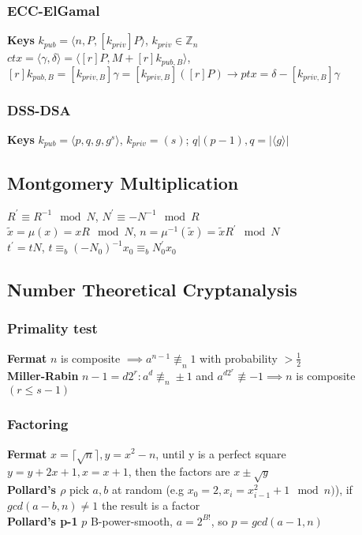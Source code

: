 \documentclass[twoside, 11pt]{article}
\begin{document}
            \subsubsection*{ECC-ElGamal}
                \textbf{Keys} $k_{pub} = \langle n, P, [k_{priv}]P \rangle$, $k_{priv} \in \mathds{Z}_{n}$ \\
                $ctx = \langle \gamma,  \delta \rangle = \langle[r]P, M+[r]k_{pub,B}\rangle$, $[r]k_{pub, B} = [k_{priv, B}]\gamma = [k_{priv, B}]([r]P) \rightarrow ptx = \delta - [k_{priv, B}]\gamma$
                
            \subsubsection*{DSS-DSA}
                \textbf{Keys} $k_{pub} = \langle p, q, g, g^{s}\rangle$, $k_{priv} = (s)$; $q | (p-1), q = |\langle g \rangle|$     

        \subsection*{Montgomery Multiplication}
            $R^{'} \equiv R^{-1} \mod{N}$, $N^{'} \equiv -N^{-1} \mod{R}$ \\
            $\tilde{x} = \mu(x) = xR \mod{N}$, $n = \mu^{-1}(\tilde{x}) = \tilde{x}R^{'} \mod{N}$ \\
            $t^{'} = tN$, $t \equiv_{b} (-N_{0})^{-1}x_{0} \equiv_{b} N_{0}^{'}x_{0}$

        \subsection*{Number Theoretical Cryptanalysis}
            \subsubsection*{Primality test}
                \textbf{Fermat} $n$ is composite $\implies a^{n-1} \not\equiv_{n} 1$ with probability $> \frac{1}{2}$ \\ 
                \textbf{Miller-Rabin} $n-1=d2^{r}: a^{d} \not\equiv_{n} \pm 1$ and $a^{d2^{r}} \not\equiv -1 \implies n$ is composite $(r \leqslant s-1)$\\
            \subsubsection*{Factoring}
                \textbf{Fermat} $x = \lceil \sqrt{n} \rceil, y=x^{2}-n$, until y is a perfect square $y=y+2x+1, x = x+1$, then the factors are $x \pm \sqrt{y}$ \\
                \textbf{Pollard's \boldmath $\rho$} pick $a, b$ at random (e.g $x_{0}=2, x_{i}=x_{i-1}^{2} + 1 \mod{n})$), if $gcd(a-b, n) \neq 1$ the result is a factor \\
                \textbf{Pollard's p-1} $p$ B-power-smooth, $a=2^{B!}$, so $p=gcd(a-1, n)$
\end{document}
